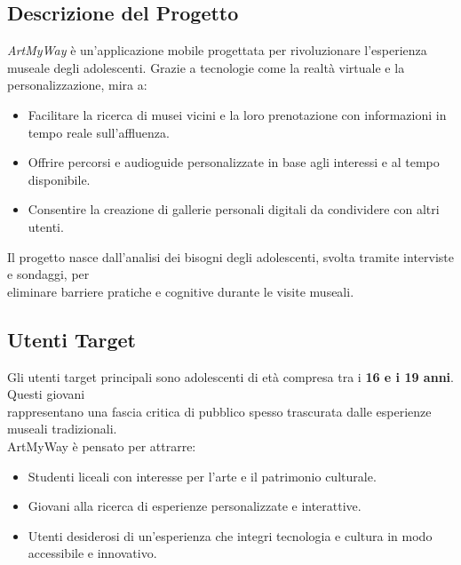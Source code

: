 \documentclass{article}
\begin{document}
\subsection{Descrizione del Progetto}
\textit{ArtMyWay} è un'applicazione mobile progettata per rivoluzionare l'esperienza museale degli adolescenti. Grazie a tecnologie come la realtà virtuale e la personalizzazione, mira a:
\begin{itemize}
\item Facilitare la ricerca di musei vicini e la loro prenotazione con informazioni in tempo reale sull'affluenza.
\item Offrire percorsi e audioguide personalizzate in base agli interessi e al tempo disponibile.
\item Consentire la creazione di gallerie personali digitali da condividere con altri utenti.
\end{itemize}
Il progetto nasce dall'analisi dei bisogni degli adolescenti, svolta tramite interviste e sondaggi, per \\ eliminare barriere pratiche e cognitive durante le visite museali.

\subsection{Utenti Target}
Gli utenti target principali sono adolescenti di età compresa tra i \textbf{16 e i 19 anni}. Questi giovani \\ rappresentano una fascia critica di pubblico spesso trascurata dalle esperienze museali tradizionali. \\ ArtMyWay è pensato per attrarre:
\begin{itemize}
\item Studenti liceali con interesse per l'arte e il patrimonio culturale.
\item Giovani alla ricerca di esperienze personalizzate e interattive.
\item Utenti desiderosi di un'esperienza che integri tecnologia e cultura in modo accessibile e innovativo.

\end{itemize}
\end{document}
